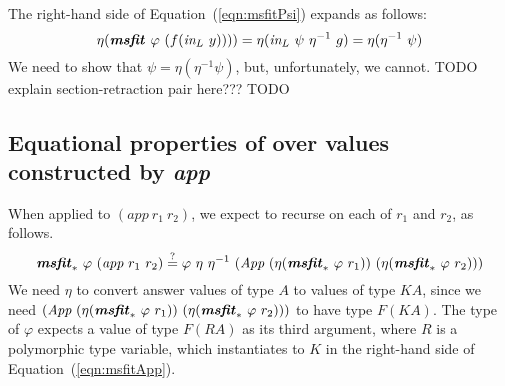 The right-hand side of Equation~(\ref{eqn:msfitPsi}) expands as follows:
\[ \eta(\textbf{\textit{msfit}}_{~}\varphi~(f(\textit{in}_{L}~y)))) = \eta(\textit{in}_{L}~\psi~\eta^{-1}~g)
	= \eta(\eta^{-1}~\psi)
\]
We need to show that $\psi=\eta(\eta^{-1}\psi)$, but, unfortunately, we cannot.
TODO explain section-retraction pair here??? TODO 


\subsection{Equational properties of \msfit{*} over
	values constructed by \textit{app}}
When applied to $(\textit{app}~r_1~r_2)$, we expect \msfit{*} to
recurse on each of $r_1$ and $r_2$, as follows.
\begin{equation}
\textbf{\textit{msfit}}_{*}~\varphi~(\textit{app}~r_1~r_2)
\stackrel{?}{=}
\varphi~\eta~\eta^{-1}~(\textit{App}~(\eta(\textbf{\textit{msfit}}_{*}~\varphi~r_1))
					~(\eta(\textbf{\textit{msfit}}_{*}~\varphi~r_2)))
\label{eqn:msfitApp}
\end{equation}
We need $\eta$ to convert answer values of type $A$ to values of type $KA$,
since we need $(\textit{App}~(\eta(\textbf{\textit{msfit}}_{*}~\varphi~r_1))
					~(\eta(\textbf{\textit{msfit}}_{*}~\varphi~r_2)))$
to have type $F(KA)$. The type of $\varphi$ expects a value of type $F(RA)$
as its third argument, where $R$ is a polymorphic type variable, which
instantiates to $K$ in the right-hand side of Equation~(\ref{eqn:msfitApp}).

